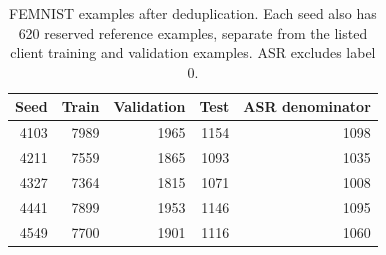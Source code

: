 \begin{table}[t]
\caption{FEMNIST examples after deduplication. Each seed also has 620 reserved reference examples, separate from the listed client training and validation examples. ASR excludes label 0.}
\label{tab:samples}
\centering\small\begin{tabular}{rrrrr}
\toprule
Seed & Train & Validation & Test & ASR denominator \\
\midrule
4103 & 7989 & 1965 & 1154 & 1098 \\
4211 & 7559 & 1865 & 1093 & 1035 \\
4327 & 7364 & 1815 & 1071 & 1008 \\
4441 & 7899 & 1953 & 1146 & 1095 \\
4549 & 7700 & 1901 & 1116 & 1060 \\
\bottomrule\end{tabular}
\end{table}
